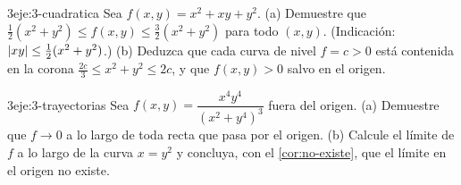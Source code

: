 \begin{ejercicio}{3}{eje:3-cuadratica}
Sea $f(x,y)=x^2+xy+y^2$. (a) Demuestre que $\tfrac12(x^2+y^2)\le f(x,y)\le\tfrac32(x^2+y^2)$ para todo $(x,y)$. (Indicación: $\lvert xy\rvert\le\frac12(x^2+y^2)$.) (b) Deduzca que cada curva de nivel $f=c>0$ está contenida en la corona $\frac{2c}{3}\le x^2+y^2\le 2c$, y que $f(x,y)>0$ salvo en el origen.
\end{ejercicio}

\begin{ejercicio}{3}{eje:3-trayectorias}
Sea $f(x,y)=\dfrac{x^4y^4}{(x^2+y^4)^3}$ fuera del origen. (a) Demuestre que $f\to0$ a lo largo de toda recta que pasa por el origen. (b) Calcule el límite de $f$ a lo largo de la curva $x=y^2$ y concluya, con el \cref{cor:no-existe}, que el límite en el origen no existe.
\end{ejercicio}

